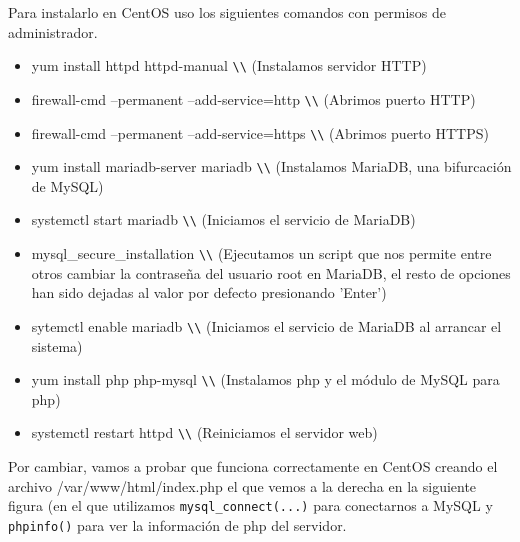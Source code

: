 \begin{flushleft}
Para instalarlo en CentOS\cite{c9b} uso los siguientes comandos con permisos de administrador.
\begin{itemize}
\item yum install httpd httpd-manual \verb|\\| (Instalamos servidor HTTP)
\item firewall-cmd --permanent --add-service=http \verb|\\| (Abrimos puerto HTTP)
\item firewall-cmd --permanent --add-service=https \verb|\\| (Abrimos puerto HTTPS)
\item yum install mariadb-server mariadb \verb|\\| (Instalamos MariaDB, una bifurcación de MySQL)
\item systemctl start mariadb \verb|\\| (Iniciamos el servicio de MariaDB)
\item mysql\_secure\_installation \verb|\\| (Ejecutamos un script que nos permite entre otros cambiar la contraseña del usuario root en MariaDB, el resto de opciones han sido dejadas al valor por defecto presionando 'Enter')
\item sytemctl enable mariadb \verb|\\| (Iniciamos el servicio de MariaDB al arrancar el sistema)
\item yum install php php-mysql \verb|\\| (Instalamos php y el módulo de MySQL para php)
\item systemctl restart httpd \verb|\\| (Reiniciamos el servidor web)
\end{itemize}

Por cambiar, vamos a probar que funciona correctamente en CentOS creando el archivo /var/www/html/index.php el que vemos a la derecha en la siguiente figura (en el que utilizamos \verb|mysql_connect(...)|\cite{c9c} para conectarnos a MySQL y \verb|phpinfo()|\cite{c9d} para ver la información de php del servidor.


\end{flushleft}
